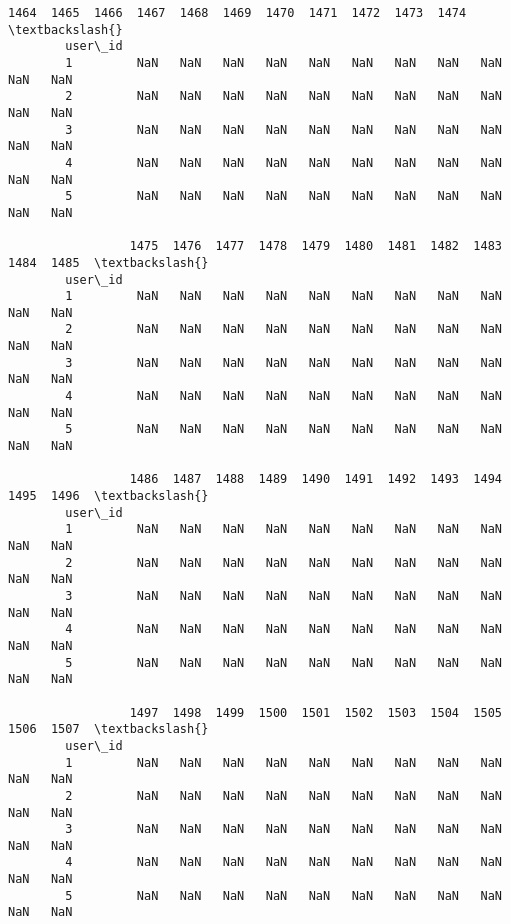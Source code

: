 \documentclass[11pt]{article}
\begin{document}
\begin{Verbatim}[commandchars=\\\{\}]
                 1464  1465  1466  1467  1468  1469  1470  1471  1472  1473  1474  \textbackslash{}
        user\_id                                                                     
        1         NaN   NaN   NaN   NaN   NaN   NaN   NaN   NaN   NaN   NaN   NaN   
        2         NaN   NaN   NaN   NaN   NaN   NaN   NaN   NaN   NaN   NaN   NaN   
        3         NaN   NaN   NaN   NaN   NaN   NaN   NaN   NaN   NaN   NaN   NaN   
        4         NaN   NaN   NaN   NaN   NaN   NaN   NaN   NaN   NaN   NaN   NaN   
        5         NaN   NaN   NaN   NaN   NaN   NaN   NaN   NaN   NaN   NaN   NaN   
        
                 1475  1476  1477  1478  1479  1480  1481  1482  1483  1484  1485  \textbackslash{}
        user\_id                                                                     
        1         NaN   NaN   NaN   NaN   NaN   NaN   NaN   NaN   NaN   NaN   NaN   
        2         NaN   NaN   NaN   NaN   NaN   NaN   NaN   NaN   NaN   NaN   NaN   
        3         NaN   NaN   NaN   NaN   NaN   NaN   NaN   NaN   NaN   NaN   NaN   
        4         NaN   NaN   NaN   NaN   NaN   NaN   NaN   NaN   NaN   NaN   NaN   
        5         NaN   NaN   NaN   NaN   NaN   NaN   NaN   NaN   NaN   NaN   NaN   
        
                 1486  1487  1488  1489  1490  1491  1492  1493  1494  1495  1496  \textbackslash{}
        user\_id                                                                     
        1         NaN   NaN   NaN   NaN   NaN   NaN   NaN   NaN   NaN   NaN   NaN   
        2         NaN   NaN   NaN   NaN   NaN   NaN   NaN   NaN   NaN   NaN   NaN   
        3         NaN   NaN   NaN   NaN   NaN   NaN   NaN   NaN   NaN   NaN   NaN   
        4         NaN   NaN   NaN   NaN   NaN   NaN   NaN   NaN   NaN   NaN   NaN   
        5         NaN   NaN   NaN   NaN   NaN   NaN   NaN   NaN   NaN   NaN   NaN   
        
                 1497  1498  1499  1500  1501  1502  1503  1504  1505  1506  1507  \textbackslash{}
        user\_id                                                                     
        1         NaN   NaN   NaN   NaN   NaN   NaN   NaN   NaN   NaN   NaN   NaN   
        2         NaN   NaN   NaN   NaN   NaN   NaN   NaN   NaN   NaN   NaN   NaN   
        3         NaN   NaN   NaN   NaN   NaN   NaN   NaN   NaN   NaN   NaN   NaN   
        4         NaN   NaN   NaN   NaN   NaN   NaN   NaN   NaN   NaN   NaN   NaN   
        5         NaN   NaN   NaN   NaN   NaN   NaN   NaN   NaN   NaN   NaN   NaN   
        

\end{Verbatim}
\end{document}
